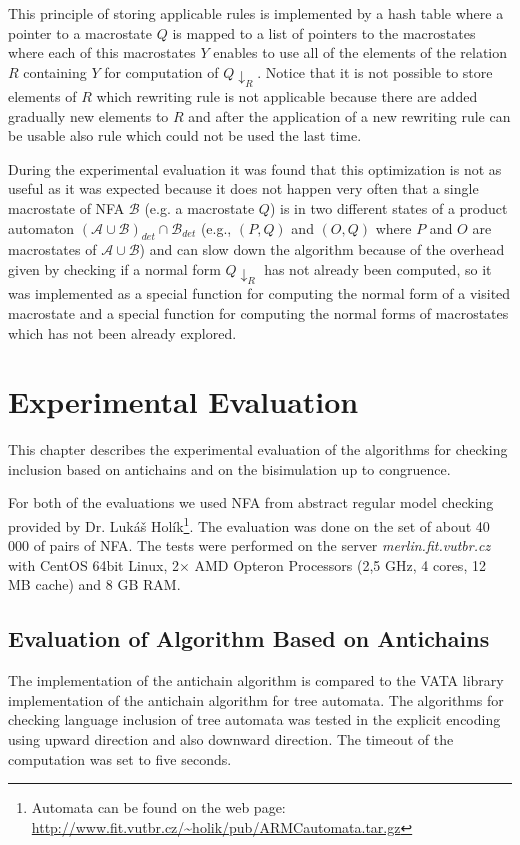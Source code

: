 This principle of storing applicable rules is implemented by a hash table where a pointer to a macrostate $Q$ is mapped to
a list of pointers to the macrostates where each of this macrostates $Y$ enables to use all of the elements of the relation $R$ containing $Y$ 
for computation of $Q{\downarrow_R}$.
Notice that it is not possible to store elements of $R$ which rewriting rule is not applicable because there are added gradually
new elements to $R$ and after the application of a new rewriting rule can be usable also rule which could not be used the last time.

During the experimental evaluation it was found that this optimization is not as useful as it was expected because it does not happen very often that a single
macrostate of NFA $\mathcal{B}$ (e.g. a macrostate $Q$) is in two different states of a 
product automaton $(\mathcal{A}\cup\mathcal{B})_{det}\cap\mathcal{B}_{det}$ (e.g., $(P,Q)$
and $(O,Q)$ where $P$ and $O$ are macrostates of $\mathcal{A}\cup\mathcal{B}$) and can slow down the algorithm because of the overhead given by checking
if a normal form $Q{\downarrow_R}$ has not already been computed, so it was implemented as a special function for computing the 
normal form of a visited macrostate and a special function for computing the normal forms of macrostates which has not been already explored. 

\chapter{Experimental Evaluation}
\label{eval}
This chapter describes the experimental evaluation of the algorithms for checking inclusion based on antichains and on the bisimulation up to congruence. 

For both of the evaluations we used NFA from abstract regular model checking provided by Dr. Lukáš Holík\footnote{
Automata can be found on the web page: \url{http://www.fit.vutbr.cz/~holik/pub/ARMCautomata.tar.gz}}.  
The evaluation was done on the set of about 40 000 of pairs of NFA. 
The tests were performed on the server \emph{merlin.fit.vutbr.cz} with CentOS 64bit Linux, 2$\times$ AMD Opteron Processors (2,5 GHz, 4 cores, 12 MB cache)
and 8 GB RAM.

\section{Evaluation of Algorithm Based on Antichains}
The implementation of the antichain algorithm is compared to the VATA library implementation of the antichain algorithm for tree automata. The
algorithms for checking language inclusion of tree automata was tested in the explicit encoding using upward direction and also downward direction. 
The timeout of the computation was set to five seconds.

